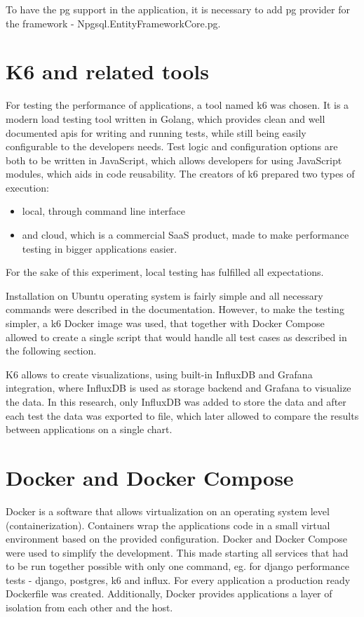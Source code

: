 To have the \acrlong{pg} support in the application, it is necessary to add \acrshort{pg} provider for the framework - Npgsql.EntityFrameworkCore.\acrlong{pg}.

\section{K6 and related tools}

For testing the performance of applications, a tool named k6 was chosen. It is a modern load testing tool written in Golang, which provides clean and well documented \acrshort{api}s for writing and running tests, while still being easily configurable to the developers needs. Test logic and configuration options are both to be written in JavaScript, which allows developers for using JavaScript modules, which aids in code reusability. The creators of k6 prepared two types of execution:
\begin{itemize}
  \item local, through command line interface
  \item and cloud, which is a commercial SaaS product, made to make performance testing in bigger applications easier.
\end{itemize}
For the sake of this experiment, local testing has fulfilled all expectations.

Installation on Ubuntu operating system is fairly simple and all necessary commands were described in the documentation. However, to make the testing simpler, a k6 Docker image was used, that together with Docker Compose allowed to create a single script that would handle all test cases as described in the following section.

K6 allows to create visualizations, using built-in InfluxDB and Grafana integration, where InfluxDB is used as storage backend and Grafana to visualize the data. In this research, only InfluxDB was added to store the data and after each test the data was exported to file, which later allowed to compare the results between applications on a single chart.

\section{Docker and Docker Compose}

Docker is a software that allows virtualization on an operating system level (containerization). Containers wrap the applications code in a small virtual environment based on the provided configuration. Docker and Docker Compose were used to simplify the development. This made starting all services that had to be run together possible with only one command, eg. for django performance tests - django, postgres, k6 and influx. For every application a production ready Dockerfile was created. Additionally, Docker provides applications a layer of isolation from each other and the host.
